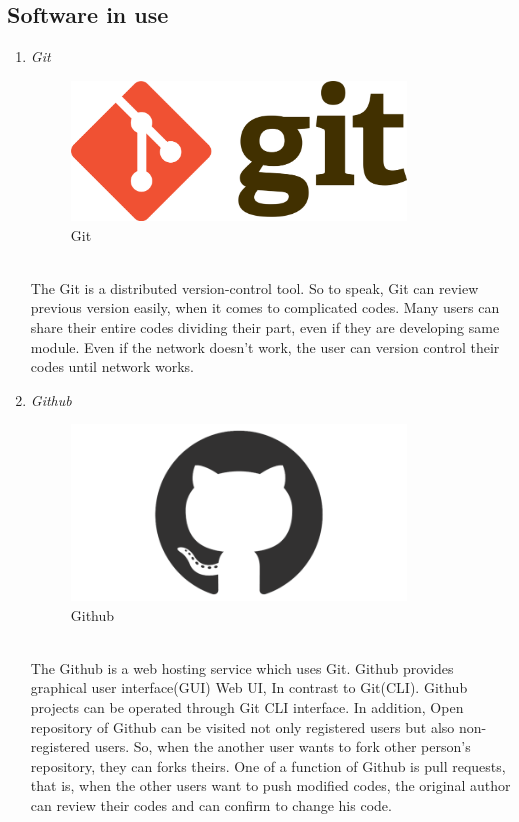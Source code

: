 \documentclass[conference]{IEEEtran}
\begin{document}
\subsection{Software in use}
\begin{enumerate} 
  \item \textit{Git } 
    \begin{figure}[htbp]
	\centerline{\includegraphics[width=89mm, scale=0.5]{fig/git.png}}
	\caption{Git}
	\label{fig}
	\end{figure}
  \\The Git is a distributed version-control tool. So to speak, Git can review previous version easily, when it comes to complicated codes. Many users can share their entire codes dividing their part, even if they are developing same module. Even if the network doesn’t work, the user can version control their codes until network works.\\
   \item \textit{Github} 
       \begin{figure}[htbp]
	\centerline{\includegraphics[width=89mm, scale=0.5]{fig/github.png}}
	\caption{Github}
	\label{fig}
	\end{figure}
   \\The Github is a web hosting service which uses Git. Github provides graphical user interface(GUI) Web UI, In contrast to Git(CLI). Github projects can be operated through Git CLI interface. In addition, Open repository of Github can be visited not only registered users but also non-registered users. So, when the another user wants to fork other person’s repository, they can forks theirs. One of a function of Github is pull requests, that is, when the other users want to push modified codes, the original author can review their codes and can confirm to change his code. \\

\end{enumerate}
\end{document}
